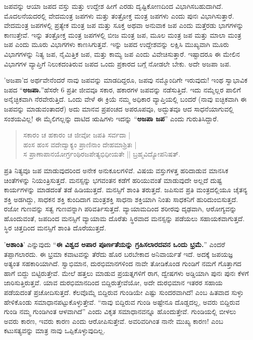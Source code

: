 ಜಪವನ್ನು ಆಯಾ ಜಪದ ವಸ್ತು ಮತ್ತು ಉದ್ದೇಶ ಹೀಗೆ ಎರಡು ದೃಷ್ಟಿಕೋಣದಿಂದ ವಿಭಾಗಿಸಬಹುದಾಗಿದೆ. ಮೊದಲನೆಯದರಲ್ಲಿ ವೇದಮಂತ್ರ ಜಪಗಳು ಮತ್ತು ತಂತ್ರೋಕ್ತ ಮಂತ್ರ ಜಪಗಳು ಎಂದು ಪುನಃ ವಿಭಾಗಿಸುತ್ತಾರೆ. ವೇದಮಂತ್ರ ಜಪಗಳಲ್ಲಿ ಪ್ರತ್ಯೇಕ ಮಂತ್ರ ಜಪ ಮತ್ತು ಸೂಕ್ತ ಅಥವಾ ಅನುವಾಕ ಜಪ ಎಂದು ಮತ್ತೆರಡು ಭಾಗಗಳನ್ನು ಕಾಣುತ್ತೇವೆ. ಇನ್ನು ತಂತ್ರೋಕ್ತ ಮಂತ್ರ ಜಪಗಳಲ್ಲಿ ಬೀಜ ಮಂತ್ರ ಜಪ, ಮೂಲ ಮಂತ್ರ ಜಪ ಮತ್ತು ಮಾಲಾ ಮಂತ್ರ ಜಪ ಎಂದು ಮೂರು ವಿಭಾಗಗಳು ಕಾಣಸಿಗುತ್ತವೆ. ಇನ್ನು ಜಪದ ಉದ್ದೇಶವನ್ನು ಲಕ್ಷಿಸಿ ಮುಖ್ಯವಾಗಿ ಮೂರು ವಿಭಾಗಗಳನ್ನು ನಿತ್ಯ ಜಪ, ನೈಮಿತ್ತಿಕ ಜಪ, ಮತ್ತು ಕಾಮ್ಯ ಜಪ ಎಂದು ವಿವೇಚಿಸುತ್ತಾರೆ. ಇಷ್ಟಾದರೂ ಈ ಮೇಲಿನ ವಿಭಾಗಗಳ ವ್ಯಾಪ್ತಿಗೆ ನಿಲುಕದಂತಿರುವ ಜಪದ ಒಂದು ಪ್ರಕಾರದ ಬಗ್ಗೆ ನೋಡಲೇ ಬೇಕು. ಅದೇ ಅಜಪಾ ಜಪ.

’ಅಜಪಾ’ದ ಅರ್ಥವೇನೆಂದರೆ ನಾವು ಜಪವನ್ನು ಮಾಡದಿದ್ದರೂ, ಜಪವು ನಮ್ಮೊಂದಿಗೇ ಇರುವುದು! ಇಂಥ ಸ್ವಾಭಾವಿಕ ಜಪದ “\textbf{ಅಜಪಾ.}”ಹೆಸರೇ 6 ಪ್ರತೀ ಜೀವವೂ ಸಕಾರ, ಹಕಾರಗಳ ಜಪವನ್ನು ನಡೆಸುತ್ತಿದೆ. ಇದು ನಮ್ಮೆಲ್ಲರ ಪಾಲಿಗೆ ಅನೈಚ್ಛಿಕವಾಗಿ ನೆರವೇರುತ್ತಿದೆ. ಒಂದು ವೇಳೆ ಈ ಕ್ರಿಯೆ ನಮ್ಮ ಅಧಿಕಾರ ವ್ಯಾಪ್ತಿಯಲ್ಲಿ ಬಂದರೆ (ನಾವು ಐಚ್ಛಿಕವಾಗಿ ಈ ಜಪವನ್ನು ಮಾಡುವಂತಾದರೆ) ಅದು ಮಾನವ ಪ್ರಪಂಚದ ಅಪರೂಪವೂ, ಅದ್ಭುತವೂ ಆದ ಸಾಧನೆಯಾಗುವಲ್ಲಿ ಸಂಶಯವಿಲ್ಲ! ಈ ಮೈಲಿಗಲ್ಲನ್ನು ದಾಟಿದ ಋಷಿಗಳು ಇದನ್ನು “\textbf{ಅಜಪಾ ಜಪ}” ಎಂದು ಗುರುತಿಸಿದ್ದಾರೆ.
\begin{verse}
ಸಕಾರಂ ಚ ಹಕಾರಂ ಚ ಜೀವೋ ಜಪತಿ ಸರ್ವದಾ |  \\
ಹಂಸ ಹಂಸ ವದೇದ್ವಾಕ್ಯಂ ಪ್ರಾಣಿನಾಂ ದೇಹಮಾಶ್ರಿತಃ |\\
ಸ ಪ್ರಾಣಾಪಾನಯೋರ್ಗ್ರಂಥಿರಜಪೇತ್ಯಭಿಧೀಯತೇ || ಬ್ರಹ್ಮವಿದ್ಯೋಪನಿಷತ್.
\end{verse}
ಪ್ರತಿ ನಿತ್ಯವೂ ಜಪ ಮಾಡುವುದರಿಂದ ಅನೇಕ ಅನುಕೂಲಗಳಿವೆ. ವಿಷಯ ವಸ್ತುಗಳತ್ತ ಹರಿದಾಡುವ ಮಾನಸಿಕ ಚಿಂತೆಗಳನ್ನು ನಿಯಂತ್ರಿಸುತ್ತದೆ. ಮನಸ್ಸನ್ನು ಭಗವಂತನ ಕಡೆಗೆ ಹರಿಯುವಂತೆ ಮಾಡುವುದೇ ಅಲ್ಲದೆ ದುಷ್ಟ ಕಾರ್ಯಗಳನ್ನು ಮಾಡದಂತೆ ತಡೆ ಹಿಡಿಯುತ್ತದೆ. ಮನಸ್ಸಿಗೆ ಶಾಂತಿ ತರುತ್ತದೆ. ಜಪಿಸುವ ಪ್ರತಿ ಮಂತ್ರದಲ್ಲಿಯೂ ಚೈತನ್ಯ ಶಕ್ತಿ ಅಡಗಿದ್ದು, ಸಾಧಕನ ಶಕ್ತಿ ಕುಂದಿದಾಗ ಮಂತ್ರಶಕ್ತಿ ಸಾಧನಾ ಶಕ್ತಿಯಾಗಿ ನಿಂತು ಸಾಧಕನಿಗೆ ಹುರಿದುಂಬಿಸುತ್ತದೆ. ರಜೋ ಗುಣವನ್ನು ಸತ್ವ ಗುಣವನ್ನಾಗಿ ಪರಿವರ್ತಿಸುತ್ತದೆ. ವ್ಯಾಯಾಮದಿಂದ ಶರೀರವು ದೃಢವಾಗಿ, ಆರೋಗ್ಯವನ್ನು ಹೊಂದುವಂತೆ, ಜಪದಿಂದ ಮನಸ್ಸಿಗೆ ವ್ಯಾಯಾಮ ದೊರೆತು ಸ್ಥಿರವಾದ ಮನಸ್ಸನ್ನು ಪಡೆಯಲು ಸಹಾಯಕವಾಗುತ್ತದೆ. ಸ್ಥಿರ  ಚಿತ್ತದಿಂದ ಮನಸ್ಸಿಗೆ ಶಾಂತಿ ದೊರೆಯುತ್ತದೆ.

’\textbf{ಅಶಾಂತಿ}’ ಎನ್ನುವುದು “\textbf{ಈ ವಿಶ್ವದ ಅಪಾರ ಪೂರ್ಣತೆಯನ್ನು ಗ್ರಹಿಸಲಾರದವನ ಒಂದು ಭ್ರಮೆ.}” ಎಂದರೆ ತಪ್ಪಾಗಲಾರದು. ಈ ಭ್ರಮಾ ಕವಾಟವನ್ನು ತೆರೆದು ಹೊರ ಬರಬೇಕಾದ ಅನಿವಾರ್ಯತೆ ಇದೆ. ಅದಕ್ಕೆ ಜಪಯಜ್ಞ ಅತ್ಯಂತ ಸಹಕಾರಿಯಾಗಿದೆ. ಸ್ವಾಭಿಮಾನ, ದುರಭಿಮಾನಗಳಿಂದ ನಾವೇ ತೋಡಿಕೊಂಡ ಗುಂಡಿಗೆ ನಮಗೆ ಗೊತ್ತಾಗದ ಹಾಗೆ ಬಿದ್ದು ಬಿಟ್ಟಿರುತ್ತೇವೆ. ಮೇಲೆ ಹತ್ತಲು ಮಾಡುವ ಪ್ರಯತ್ನಗಳಿಗೆ ರಾಗ, ದ್ವೇಷಗಳು ಅಡ್ಡಿಯಾಗಿ ಪುನಃ ಪುನಃ ಕೆಳಗೆ ಜಾರಿಸುತ್ತಿರುತ್ತವೆ. ಯಾವ ದುರಭಿಮಾನದಿಂದ ಬಿದ್ದಿರುತ್ತೇವೆಯೋ, ಅದೇ ದುರಭಿಮಾನ ಇತರರ ಸಹಾಯ ಪಡೆಯದಂತೆ ಪ್ರಚೋದಿಸುತ್ತದೆ. ಕೆಲವೊಮ್ಮೆ ಬಿದ್ದಿರುವ ಗುಂಡಿಯೇ ಎಷ್ಟು ಸುಂದರವಾಗಿದೆ! ಎಂಬ ಹಿತವಾದ ಸುಳ್ಳು ಹೇಳಿಕೊಂಡು ಸಮಾಧಾನಪಟ್ಟುಕೊಳ್ಳುತ್ತೇವೆ. “ನಾವು ಬಿದ್ದಿರುವ ಗುಂಡಿ ಅಷ್ಟೇನೂ ದೊಡ್ಡದಲ್ಲ, ಅವರು ಬಿದ್ದಿರುವ ಗುಂಡಿ ನಮ್ಮ ಗುಂಡಿಗಿಂತ ಆಳವಾಗಿದೆ” ಎಂದು ವಿಕೃತ ಸಮಾಧಾನವನ್ನೂ ಹೊಂದುತ್ತೇವೆ. ಗುಂಡಿಯಲ್ಲಿ ಬೀಳಲು ಅವರು ಕಾರಣ, ಇವರು ಕಾರಣ ಎಂದು ಆರೋಪಿಸುತ್ತೇವೆ. ಅವರಿವರಿಗಿಂತ ನಾನೇ ಮುಖ್ಯ ಕಾರಣ! ಎಂಬ ಕಟುಸತ್ಯವನ್ನು ಮಾತ್ರ ನಾವು ಒಪ್ಪಿಕೊಳ್ಳುವುದಿಲ್ಲ.


